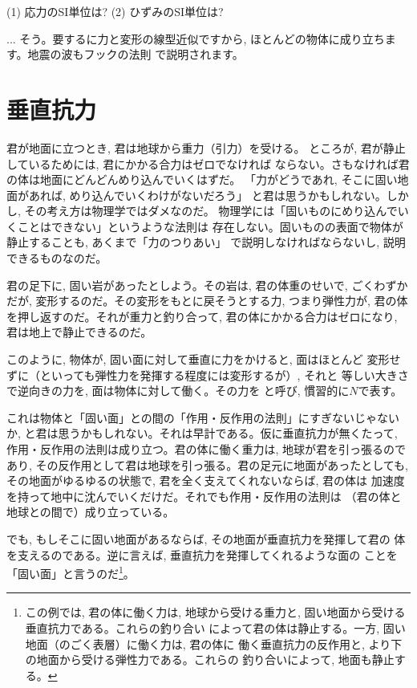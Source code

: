 \begin{q}\label{q:stress_strain} 
(1) 応力のSI単位は? 
(2) ひずみのSI単位は?
\end{q}


\begin{faq}{\small{}
... そう。要するに力と変形の線型近似ですから, 
ほとんどの物体に成り立ちます。地震の波もフックの法則
で説明されます。}\end{faq}
\mv

\section{垂直抗力}
君が地面に立つとき, 君は地球から重力（引力）を受ける。
ところが, 君が静止しているためには, 君にかかる合力はゼロでなければ
ならない。さもなければ君の体は地面にどんどんめり込んでいくはずだ。
「力がどうであれ, そこに固い地面があれば, めり込んでいくわけがないだろう」
と君は思うかもしれない。しかし, その考え方は物理学ではダメなのだ。
物理学には「固いものにめり込んでいくことはできない」というような法則は
存在しない。固いものの表面で物体が静止することも, あくまで「力のつりあい」
で説明しなければならないし, 説明できるものなのだ。

君の足下に, 固い岩があったとしよう。その岩は, 君の体重のせいで, 
ごくわずかだが, 変形するのだ。その変形をもとに戻そうとする力, 
つまり弾性力が, 君の体を押し返すのだ。それが重力と釣り合って, 
君の体にかかる合力はゼロになり, 君は地上で静止できるのだ。

このように, 物体が, 固い面に対して垂直に力をかけると, 面はほとんど
変形せずに（といっても弾性力を発揮する程度には変形するが）, それと
等しい大きさで逆向きの力を, 面は物体に対して働く。その力を
と呼び, 慣習的に$N$で表す。

これは物体と「固い面」との間の「作用・反作用の法則」にすぎないじゃないか, 
と君は思うかもしれない。それは早計である。仮に垂直抗力が無くたって, 
作用・反作用の法則は成り立つ。君の体に働く重力は, 地球が君を引っ張るので
あり, その反作用として君は地球を引っ張る。君の足元に地面があったとしても, 
その地面がゆるゆるの状態で, 君を全く支えてくれないならば, 君の体は
加速度を持って地中に沈んでいくだけだ。それでも作用・反作用の法則は
（君の体と地球との間で）成り立っている。

でも, もしそこに固い地面があるならば, その地面が垂直抗力を発揮して君の
体を支えるのである。逆に言えば, 垂直抗力を発揮してくれるような面の
ことを「固い面」と言うのだ\footnote{この例では, 君の体に働く力は, 
地球から受ける重力と, 固い地面から受ける垂直抗力である。これらの釣り合い
によって君の体は静止する。一方, 固い地面（のごく表層）に働く力は, 君の体に
働く垂直抗力の反作用と, より下の地面から受ける弾性力である。これらの
釣り合いによって, 地面も静止する。}。

